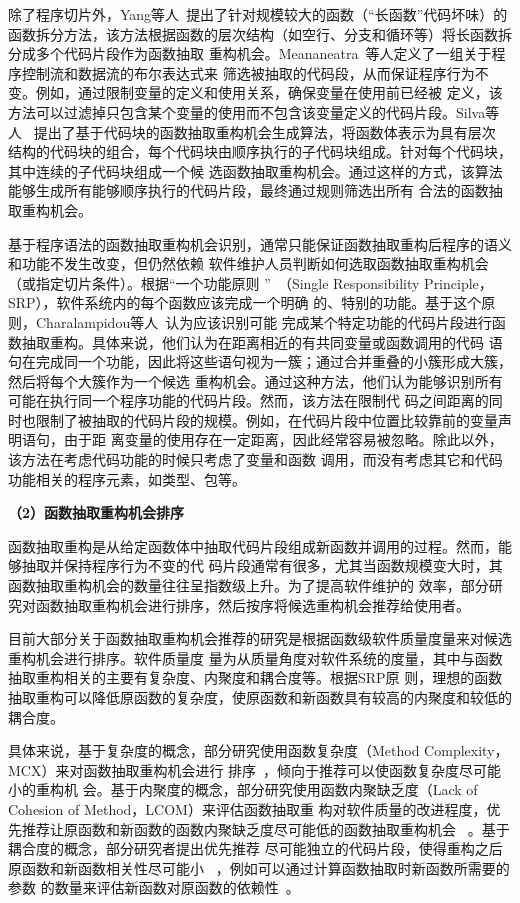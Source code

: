 除了程序切片外，Yang等人~\cite{yang2009identifying}提出了针对规模较大的函数（``长函数''代码坏味）的
函数拆分方法，该方法根据函数的层次结构（如空行、分支和循环等）将长函数拆分成多个代码片段作为函数抽取
重构机会。Meananeatra~\cite{meananeatra2011using}等人定义了一组关于程序控制流和数据流的布尔表达式来
筛选被抽取的代码段，从而保证程序行为不变。例如，通过限制变量的定义和使用关系，确保变量在使用前已经被
定义，该方法可以过滤掉只包含某个变量的使用而不包含该变量定义的代码片段。Silva等人
~\cite{silva:ICPC14,silva:CoRR15}提出了基于代码块的函数抽取重构机会生成算法，将函数体表示为具有层次
结构的代码块的组合，每个代码块由顺序执行的子代码块组成。针对每个代码块，其中连续的子代码块组成一个候
选函数抽取重构机会。通过这样的方式，该算法能够生成所有能够顺序执行的代码片段，最终通过规则筛选出所有
合法的函数抽取重构机会。

基于程序语法的函数抽取重构机会识别，通常只能保证函数抽取重构后程序的语义和功能不发生改变，但仍然依赖
软件维护人员判断如何选取函数抽取重构机会（或指定切片条件）。根据``一个功能原则
''~\cite{martin2003agile}（Single Responsibility Principle，SRP），软件系统内的每个函数应该完成一个明确
的、特别的功能。基于这个原则，Charalampidou等人~\cite{charalampidou2016identifying}认为应该识别可能
完成某个特定功能的代码片段进行函数抽取重构。具体来说，他们认为在距离相近的有共同变量或函数调用的代码
语句在完成同一个功能，因此将这些语句视为一簇；通过合并重叠的小簇形成大簇，然后将每个大簇作为一个候选
重构机会。通过这种方法，他们认为能够识别所有可能在执行同一个程序功能的代码片段。然而，该方法在限制代
码之间距离的同时也限制了被抽取的代码片段的规模。例如，在代码片段中位置比较靠前的变量声明语句，由于距
离变量的使用存在一定距离，因此经常容易被忽略。除此以外，该方法在考虑代码功能的时候只考虑了变量和函数
调用，而没有考虑其它和代码功能相关的程序元素，如类型、包等。

\textbf{（2）函数抽取重构机会排序}

函数抽取重构是从给定函数体中抽取代码片段组成新函数并调用的过程。然而，能够抽取并保持程序行为不变的代
码片段通常有很多，尤其当函数规模变大时，其函数抽取重构机会的数量往往呈指数级上升。为了提高软件维护的
效率，部分研究对函数抽取重构机会进行排序，然后按序将候选重构机会推荐给使用者。

目前大部分关于函数抽取重构机会推荐的研究是根据函数级软件质量度量来对候选重构机会进行排序。软件质量度
量为从质量角度对软件系统的度量，其中与函数抽取重构相关的主要有复杂度、内聚度和耦合度等。根据SRP原
则，理想的函数抽取重构可以降低原函数的复杂度，使原函数和新函数具有较高的内聚度和较低的耦合度。

具体来说，基于复杂度的概念，部分研究使用函数复杂度（Method Complexity，MCX）来对函数抽取重构机会进行
排序~\cite{meananeatra2011using, yang2009identifying}，倾向于推荐可以使函数复杂度尽可能小的重构机
会。基于内聚度的概念，部分研究使用函数内聚缺乏度（Lack of Cohesion of Method，LCOM）来评估函数抽取重
构对软件质量的改进程度，优先推荐让原函数和新函数的函数内聚缺乏度尽可能低的函数抽取重构机会
~\cite{meananeatra2011using, charalampidou2016identifying}。基于耦合度的概念，部分研究者提出优先推荐
尽可能独立的代码片段，使得重构之后原函数和新函数相关性尽可能小
~\cite{yang2009identifying,silva:ICPC14,silva:CoRR15}，例如可以通过计算函数抽取时新函数所需要的参数
的数量来评估新函数对原函数的依赖性~\cite{yang2009identifying}。

